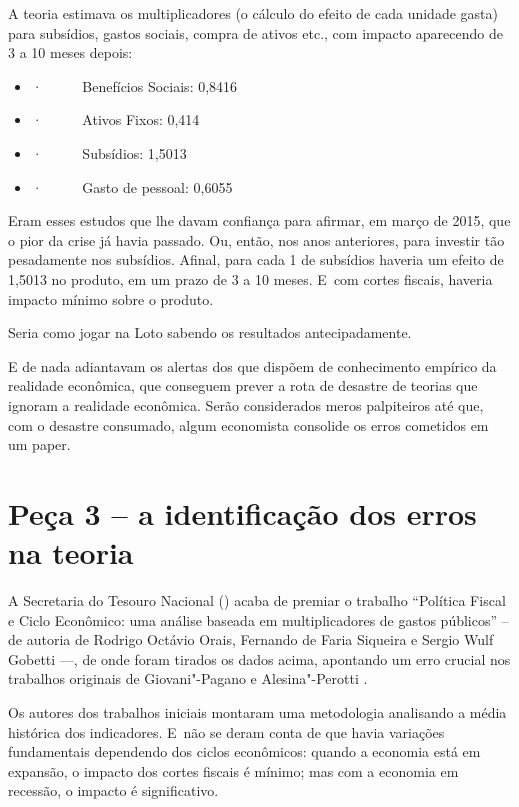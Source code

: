 A teoria estimava os multiplicadores (o cálculo do efeito de cada
unidade gasta) para subsídios, gastos sociais, compra de ativos etc.,
com impacto aparecendo de 3 a 10 meses depois:

\begin{itemize}
\itemsep1pt\parskip0pt
\item
  ·~~~~~ Benefícios Sociais: 0,8416
\item
  ·~~~~~ Ativos Fixos: 0,414
\item
  ·~~~~~ Subsídios: 1,5013
\item
  ·~~~~~ Gasto de pessoal: 0,6055
\end{itemize}

Eram esses estudos que lhe davam confiança para afirmar, em março de
2015, que o pior da crise já havia passado. Ou, então, nos anos
anteriores, para investir tão pesadamente nos subsídios. Afinal, para
cada 1 de subsídios haveria um efeito de 1,5013 no produto, em um prazo
de 3 a 10 meses. E~com cortes fiscais, haveria impacto mínimo sobre o
produto.

Seria como jogar na Loto sabendo os resultados antecipadamente.

E de nada adiantavam os alertas dos que dispõem de conhecimento empírico
da realidade econômica, que conseguem prever a rota de desastre de
teorias que ignoram a realidade econômica. Serão considerados meros
palpiteiros até que, com o desastre consumado, algum economista
consolide os erros cometidos em um paper.

\section{Peça 3 -- a identificação dos erros na teoria}

A Secretaria do Tesouro Nacional () acaba de premiar o trabalho
``Política Fiscal e Ciclo Econômico: uma análise baseada em
multiplicadores de gastos públicos'' -- de autoria de Rodrigo Octávio
Orais, Fernando de Faria Siqueira e Sergio Wulf Gobetti \mbox{---,} de onde
foram tirados os dados acima, apontando um erro crucial nos trabalhos
originais de Giovani"-Pagano e Alesina"-Perotti .

Os autores dos trabalhos iniciais montaram uma metodologia analisando a
média histórica dos indicadores. E~não se deram conta de que havia
variações fundamentais dependendo dos ciclos econômicos: quando a
economia está em expansão, o impacto dos cortes fiscais é mínimo; mas
com a economia em recessão, o impacto é significativo.


